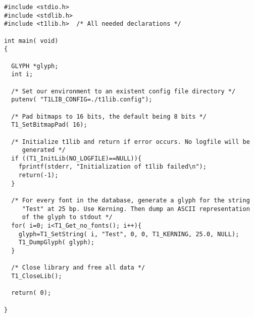 \begin{verbatim}
#include <stdio.h>
#include <stdlib.h>
#include <t1lib.h>  /* All needed declarations */

int main( void)
{

  GLYPH *glyph;
  int i;
  
  /* Set our environment to an existent config file directory */
  putenv( "T1LIB_CONFIG=./t1lib.config");

  /* Pad bitmaps to 16 bits, the default being 8 bits */
  T1_SetBitmapPad( 16);
  
  /* Initialize t1lib and return if error occurs. No logfile will be
     generated */
  if ((T1_InitLib(NO_LOGFILE)==NULL)){
    fprintf(stderr, "Initialization of t1lib failed\n");
    return(-1);
  }

  /* For every font in the database, generate a glyph for the string
     "Test" at 25 bp. Use Kerning. Then dump an ASCII representation
     of the glyph to stdout */
  for( i=0; i<T1_Get_no_fonts(); i++){
    glyph=T1_SetString( i, "Test", 0, 0, T1_KERNING, 25.0, NULL);
    T1_DumpGlyph( glyph);
  }

  /* Close library and free all data */
  T1_CloseLib();
  
  return( 0);
  
}
\end{verbatim}

